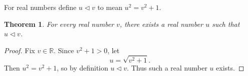 \documentclass{article}
\newtheorem{theorem}{Theorem}
\begin{document}
For real numbers define $u \triangleleft v$ to mean $u^2=v^2+1$.

\begin{theorem}\label{thm:lift}
For every real number $v$, there exists a real number $u$
such that $u\triangleleft v$.
\end{theorem}

\begin{proof}
Fix $v\in\mathbb R$. Since $v^2+1>0$, let
\[
u=\sqrt{v^2+1}.
\]
Then $u^2=v^2+1$, so by definition $u\triangleleft v$.
Thus such a real number $u$ exists.
\end{proof}
\end{document}
